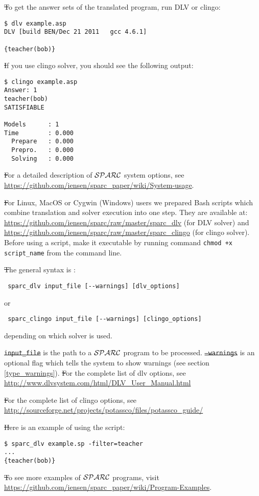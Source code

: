 \documentclass[12pt, letterpaper]{article}
\begin{document}
\st To get the answer sets of the translated program, run DLV or clingo:

\begin{verbatim}
$ dlv example.asp
DLV [build BEN/Dec 21 2011   gcc 4.6.1]

{teacher(bob)}
\end{verbatim}

\st If you use clingo solver, you should  see the following output:

\begin{verbatim}
$ clingo example.asp
Answer: 1
teacher(bob) 
SATISFIABLE

Models      : 1     
Time        : 0.000
  Prepare   : 0.000
  Prepro.   : 0.000
  Solving   : 0.000
\end{verbatim}


\st  For a detailed description of ${\cal SPARC}$ system options, see 
\url{https://github.com/iensen/sparc_paper/wiki/System-usage}.

\st For Linux, MacOS or Cygwin (Windows) users we prepared Bash scripts which combine translation and solver execution into one step.
They are available at: \url{https://github.com/iensen/sparc/raw/master/sparc_dlv} (for DLV solver) and \url{https://github.com/iensen/sparc/raw/master/sparc_clingo} (for clingo solver).
Before using a script, make it executable by running command
\texttt{chmod +x script\_name} from the command line.

\st The general syntax is :
\begin{verbatim}
 sparc_dlv input_file [--warnings] [dlv_options]
\end{verbatim}
or 
\begin{verbatim}
 sparc_clingo input_file [--warnings] [clingo_options]
\end{verbatim}
depending on which solver is used.


\st
\texttt{input\_file} is the path to a ${\cal SPARC}$ program to be processed. 
\st
\texttt{--warnings} is an optional flag which tells the system to show warnings 
(see section \ref{type_warnings}).
\st
For the complete list of dlv options, see 
\url{http://www.dlvsystem.com/html/DLV_User_Manual.html }

\st
For the complete list of clingo options, see 
\url{http://sourceforge.net/projects/potassco/files/potassco_guide/}


\st
Here is an example of using the script:
\begin{verbatim}
$ sparc_dlv example.sp -filter=teacher
...
{teacher(bob)}
\end{verbatim}
\st To see more examples of ${\cal SPARC}$ programs, visit \url{https://github.com/iensen/sparc_paper/wiki/Program-Examples}.
\end{document}
